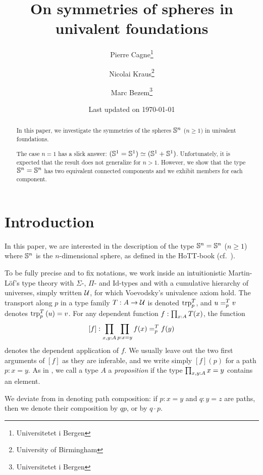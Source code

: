 \documentclass[english,a4]{article}
\title{{On symmetries of spheres in univalent foundations}}%
\author{Pierre Cagne\thanks{Universitetet i Bergen} \and Nicolai
  Kraus\thanks{University of Birmingham} \and Marc
  Bezem\thanks{Universitetet i Bergen}}%
\date{\normalsize Last updated on \today}%
\renewcommand{\ap}[1]{\left[{#1}\right]}
\begin{document}
\maketitle

\begin{abstract}
  In this paper, we investigate the symmetries of the spheres $\Sn n$
  ($n\geq 1)$ in univalent foundations.

  The case $n=1$ has a slick answer: $(\Sc = \Sc) \weq (\Sc +
  \Sc)$. Unfortunately, it is expected that the result does not
  generalize for $n>1$. However, we show that the type $\Sn n = \Sn n$
  has two equivalent connected components and we exhibit members for
  each component.
\end{abstract}


\section{Introduction}

In this paper, we are interested in the description of the type
$\Sn n = \Sn n$ ($n\geq 1$) where $\Sn n$ is the $n$-dimensional
sphere, as defined in the HoTT-book (cf.~\cite{HoTT}).

To be fully precise and to fix notations, we work inside an
intuitionistic Martin-Löf's type theory with $\Sigma$-, $\Pi$- and
$\mathrm{Id}$-types and with a cumulative hierarchy of universes,
simply written $\UU$, for which Voevodsky's univalence axiom hold. The
transport along $p$ in a type family $T:A\to \UU$ is denoted
$\trp [T] p$, and $\pathover u T p v$ denotes $\trp [T] p {(u)} = v$.
For any dependent function $f\from\prod_{x\from A}T(x)$,
the function
\begin{displaymath}
  \ap f:\prod_{x,y\from A}\prod_{p\from x=y} \pathover {f(x)} T p
  {f(y)}
\end{displaymath}
denotes the dependent application of $f$. We usually leave out the two
first arguments of $\ap f$ as they are inferable, and we write simply
$\ap f (p)$ for a path $p:x=y$. As in \cite{HoTT}, we call a type $A$
a {\em proposition} if the type $\prod_{x,y\from A} x=y$ contains an
element.

We deviate from \cite{HoTT} in denoting path composition:
if $p:x=y$ and $q:y=z$ are paths, then we denote their
composition by $qp$, or by $q\cdot p$.
\end{document}
